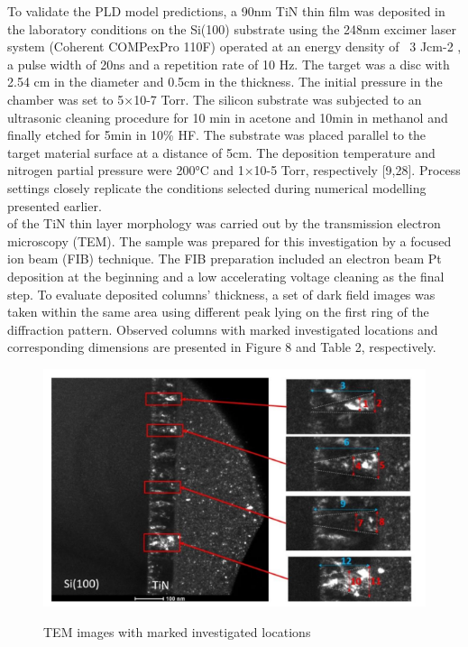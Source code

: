 \documentclass[journal,article,submit,pdftex,moreauthors]{Definitions/mdpi}
\begin{document}
To validate the PLD model predictions, a 90nm TiN thin film was deposited in the laboratory conditions on the Si(100) substrate using the 248nm excimer laser system (Coherent COMPexPro 110F) operated at an energy density of ~3 Jcm-2 , a pulse width of 20ns and a repetition rate of 10 Hz. The target was a disc with 2.54 cm in the diameter and 0.5cm in the thickness. The initial pressure in the chamber was set to 5×10-7 Torr. The silicon substrate was subjected to an ultrasonic cleaning procedure for 10 min in acetone and 10min in methanol and finally etched for 5min in 10\% HF. The substrate was placed parallel to the target material surface at a distance of 5cm. The deposition temperature and nitrogen partial pressure were 200°C and 1×10-5 Torr, respectively [9,28]. Process settings closely replicate the conditions selected during numerical modelling presented earlier.\\ 
 of the TiN thin layer morphology was carried out by the transmission electron microscopy (TEM). The sample was prepared for this investigation by a focused ion beam (FIB) technique. The FIB preparation included an electron beam Pt deposition at the beginning and a low accelerating voltage cleaning as the final step. To evaluate deposited columns' thickness, a set of dark field images was taken within the same area using different peak lying on the first ring of the diffraction pattern. Observed columns with marked investigated locations and corresponding dimensions are presented in Figure 8 and Table 2, respectively.
 
\begin{figure}[H]
  \captionsetup{justification=centering}
  \centering
  \includegraphics{Definitions/picture8.png}
  \label{fig:obraz8}
    \caption{TEM images with marked investigated locations}
\end{figure}   
 
\end{document}
